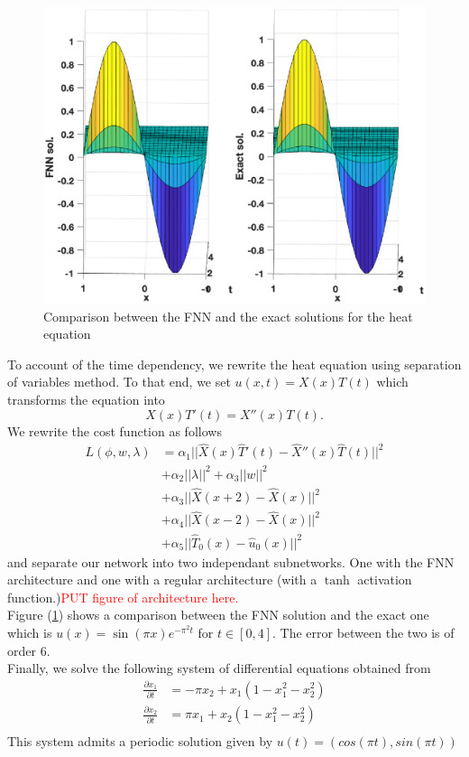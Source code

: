 \documentclass[11pt]{article}
\begin{document}
  \begin{figure}[!htb]
    \centering
    \includegraphics[width=.9\textwidth]{fnnvsexactheat.eps}
    \caption{Comparison between the FNN and the exact solutions for the heat equation}
    \label{fig:fnnvsexactheat}
\end{figure}
To account of the time dependency, we rewrite the heat equation using separation of variables method. To that end, we set $u(x,t) = X(x)T(t)$ which transforms the equation into 
$$X(x)T'(t) = X''(x)T(t).$$
We rewrite the cost function as follows 
\begin{align*}
    L(\phi, w, \lambda) &= \alpha_1||\hat{X}(x)\hat{T}'(t)-\hat{X}''(x)\hat{T}(t)||^2  \\ &+\alpha_2||\lambda||^2 + \alpha_3||w||^2 \\ 
    &+\alpha_3 ||\hat{X}(x + 2) - \hat{X}(x)||^2 \\
    &+\alpha_4||\hat{X}(x - 2) - \hat{X}(x)||^2  \\
   &+ \alpha_5||\hat{T}_0(x) - \hat{u}_0(x)||^2
\end{align*}
and separate our network into two independant subnetworks. One with the FNN architecture and one with a regular architecture (with a $\tanh$ activation function.)\textcolor{red}{PUT figure of architecture here.}\\ 
 Figure (\ref{fig:fnnvsexactheat}) shows a comparison between the FNN solution and the exact one which is $u(x) = \sin(\pi x)e^{-\pi^2 t}$ for $t \in [0,4]$. The error between the two is of order $6$. \\
Finally, we solve the following system of differential equations obtained from \cite{Teschl2012} 
\begin{align}
    \frac{\partial x_1}{\partial t} &= -\pi  x_2 + x_1(1 - x_1^2 - x_2^2) \nonumber \\ 
    \frac{\partial x_2}{\partial t} &= \pi  x_1 + x_2(1 - x_1^2 - x_2^2) \\
\end{align}\label{sys_per}
This system admits a periodic solution given by $u(t)=(cos(\pi t), sin(\pi t))$
\end{document}
